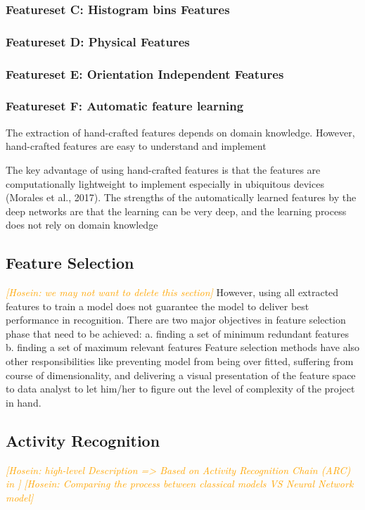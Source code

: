 \documentclass[journal,article,submit,moreauthors,pdftex]{Definitions/mdpi}
\newcommand{\hosein}[1]{\textcolor{orange}{{\it [Hosein: #1]}}}
\begin{document}
\subsubsection{Featureset C: Histogram bins Features}
\subsubsection{Featureset D: Physical Features}
\subsubsection{Featureset E: Orientation Independent Features}
\subsubsection{Featureset F: Automatic feature learning}

The extraction of hand-crafted features depends on domain knowledge. However, hand-crafted features are
easy to understand and implement

The key advantage of using hand-crafted features is that the features are computationally lightweight to implement especially in ubiquitous devices (Morales et al., 2017).
The strengths of the automatically learned features by the deep networks are that the learning can be very deep, and the learning process does not rely on domain knowledge

\subsection{Feature Selection}
\hosein{we may not want to delete this section}
However, using all extracted features to train a model does not guarantee the model to deliver best performance in recognition. There are two major objectives in feature selection phase that need to be achieved: 
a.	finding a set of minimum redundant features
b.	finding a set of maximum relevant features
Feature selection methods have also other responsibilities like preventing model from being over fitted, suffering from course of dimensionality, and delivering a visual presentation of the feature space to data analyst to let him/her to figure out the level of complexity of the project in hand. 

\subsection{Activity Recognition}
\hosein{high-level Description => Based on Activity Recognition Chain (ARC) in \cite{bulling2014tutorial}}
\hosein{Comparing the process between classical models VS Neural Network model}
\end{document}
